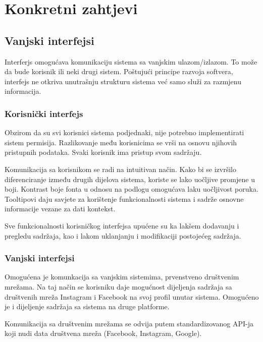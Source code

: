 \section{Konkretni zahtjevi}
\subsection{Vanjski interfejsi}
Interferjs omogućava komunikaciju sistema sa vanjskim ulazom/izlazom. To može da bude korisnik ili neki drugi sistem. Poštujući principe razvoja softvera, interfejs ne otkriva unutrašnju strukturu sistema već samo služi za razmjenu informacija.
\subsubsection{Korisnički interfejs}
Obzirom da su svi korisnici sistema podjednaki, nije potrebno implementirati sistem permisija. Razlikovanje među korisnicima se vrši na osnovu njihovih pristupnih podataka. Svaki korisnik ima pristup svom sadržaju.

Komunikacija sa korisnikom se radi na intuitivan način. Kako bi se izvršilo diferenciranje između drugih dijelova sistema, koriste se lako uočljive promjene u boji. Kontrast boje fonta u odnosu na podlogu omogućava laku uočljivost poruka. Tooltipovi daju savjete za korištenje funkcionalnosti sistema i sadrže osnovne informacije vezane za dati kontekst.

Sve funkcionalnosti korisničkog interfejsa upućene su ka lakšem dodavanju i pregledu sadržaja, kao i lakom uklanjanju i modifikaciji postojećeg sadržaja.

\subsubsection{Vanjski interfejsi}
Omogućena je komunkacija sa vanjskim sistemima, prvenstveno društvenim mrežama. Na taj način se korisniku daje mogućnost dijeljenja sadržaja sa društvenih mreža Instagram i Facebook na svoj profil unutar sistema. Omogućeno je i dijeljenje sadržaja sa sistema na druge platforme.

Komunikacija sa društvenim mrežama se odvija putem standardizovanog API-ja koji nudi data društvena mreža (Facebook, Instagram, Google).
